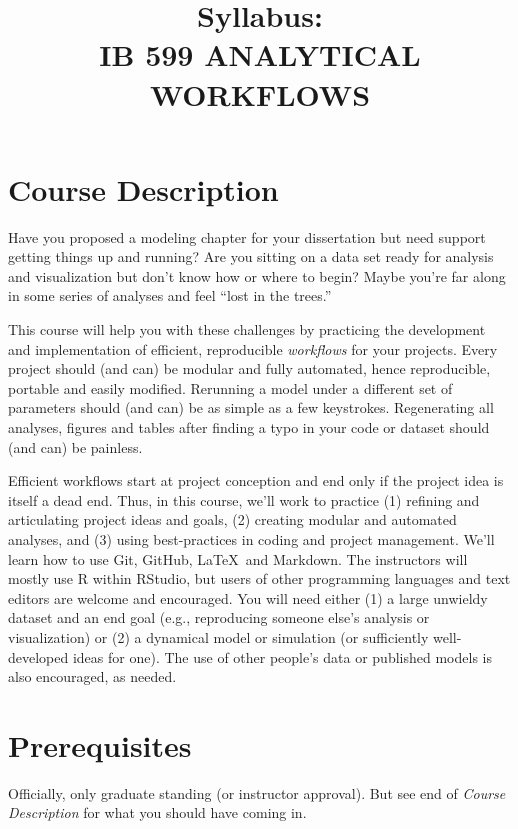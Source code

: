 \documentclass[10pt]{article}
\title{Syllabus:\\IB 599 ANALYTICAL WORKFLOWS}
\author{}
\date{}
\begin{document}
\maketitle
\vspace{-50pt}


\section*{Course Description}
	Have you proposed a modeling chapter for your dissertation but need support getting things up and
	running?
	Are you sitting on a data set ready for analysis and visualization but don't know how or
	where to begin?
	Maybe you're far along in some series of analyses and feel ``lost in the trees.''

	This course will help you with these challenges by practicing the development and implementation of
	efficient, reproducible \emph{workflows} for your projects.
	Every project should (and can) be modular and fully automated, hence reproducible, portable and
	easily modified.
	Rerunning a model under a different set of parameters should (and can) be as simple as a few
	keystrokes.
	Regenerating all analyses, figures and tables after finding a typo in your code or dataset should (and
	can) be painless.

	Efficient workflows start at project conception and end only if the project idea is itself a dead end.
	Thus, in this course, we'll work to practice
	(1) refining and articulating project ideas and goals,
	(2) creating modular and automated analyses, and
	(3) using best-practices in coding and project management.
	We'll learn how to use Git, GitHub, \LaTeX\, and Markdown.
	The instructors will mostly use \textsf{R} within RStudio, but users of other programming languages
	and text editors are welcome and encouraged.
	You will need either
	(1) a large unwieldy dataset and an end goal (e.g., reproducing someone else's analysis or
	visualization) or
	(2) a dynamical model or simulation (or sufficiently well-developed ideas for one).
	The use of other people's data or published models is also encouraged, as needed.

\section*{Prerequisites}
\noindent
	Officially, only graduate standing (or  instructor approval).
	But see  end of \emph{Course Description} for what you should have coming in.
\end{document}
